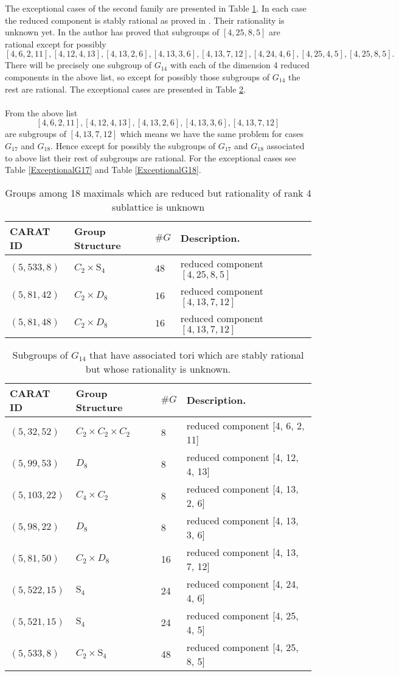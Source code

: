 \documentclass{article}
\theoremstyle{plain}
\theoremstyle{definition}
\begin{document}
\noindent
The exceptional cases of the second family are presented in Table \ref{Tbl:RationalityUnknown}. In each case the reduced component is stably rational as proved in \cite{Hoshi}. Their rationality is unknown yet. In \cite{Nicole1} the author has proved that subgroups of $[ 4, 25, 8, 5 ]$ are rational except for possibly $$[4, 6, 2, 11], [4, 12, 4, 13], [4, 13, 2, 6], [4, 13, 3, 6], [4, 13, 7, 12], [4, 24, 4, 6], [4, 25, 4, 5], [4, 25, 8, 5].$$
There will be precisely one subgroup of $G_{14}$ with each of the dimension 4 reduced components in the above list, so except for possibly those subgroups of $G_{14}$ the rest are rational. The exceptional cases are presented in Table \ref{ExceptionalG14}.\\
\\
From the above list $$[4, 6, 2, 11], [4, 12, 4, 13], [4, 13, 2, 6], [4, 13, 3, 6], [4, 13, 7, 12]$$ are subgroups of $[4, 13, 7, 12]$ which means we have the same problem for cases $G_{17}$ and $G_{18}$. Hence except for possibly the subgroups of $G_{17}$ and $G_{18}$ associated to above list their rest of subgroups are rational. For the exceptional cases see Table \ref{ExceptionalG17} and Table \ref{ExceptionalG18}.
 \begin{table}[H] 
\centering
\begin{tabular}{lllll}
CARAT ID & Group Structure & $\#G$ & Description.\\\hline
 $(5,533,8)$ & $C_2\times \mathrm{S}_4$ & $48$  & reduced component $[ 4, 25, 8, 5 ]$ &\\
 $(5,81,42)$ & $C_2\times D_8$ & $16$  & reduced component $[ 4, 13, 7, 12 ]$&\\
 $(5,81,48)$ & $C_2\times D_8$ & $16$  & reduced component $[ 4, 13, 7, 12 ]$ &
\end{tabular}
\caption{Groups among 18 maximals which are reduced but rationality of rank 4 sublattice is unknown}
\label{Tbl:RationalityUnknown} 
\end{table}
\begin{table}[H]
\centering
\begin{tabular}{llll}
CARAT ID & Group Structure & $\#G$ & Description.\\\hline
$( 5, 32, 52)$ &	$C_2 \times C_2 \times C_2$& 8 &reduced component 	[4, 6, 2, 11]\\
$( 5, 99, 53 )$ &	$D_8$ & 8&	reduced component [4, 12, 4, 13]\\
$( 5, 103, 22 )$ & $C_4 \times C_2$& 8 &reduced component [4, 13, 2, 6]\\
$( 5, 98, 22 )$& 	$D_8$ & 8&	reduced component [4, 13, 3, 6]\\
$( 5, 81, 50 )$ &		$C_2 \times D_8$ & 16& reduced component [4, 13, 7, 12]\\
$( 5, 522, 15)$ &	$\mathrm{S}_4$& 24&	reduced component 	[4, 24, 4, 6]\\
$( 5, 521, 15 )$ &		$\mathrm{S}_4$ &24&		reduced component [4, 25, 4, 5]\\
$( 5, 533, 8 )$&		$C_2 \times	 \mathrm{S}_4$ & 48&		reduced component [4, 25, 8, 5]
\end{tabular}
\caption{Subgroups of $G_{14}$ that have associated tori which are stably rational but whose rationality is unknown.}
\label{ExceptionalG14}
\end{table}
\end{document}
